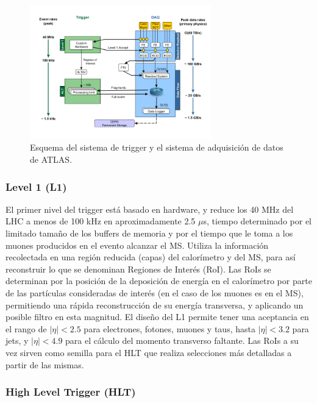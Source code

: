 \begin{figure}
  \centering
  \includegraphics[width=0.7\textwidth]{images/tdaq.png}
  \caption{Esquema del sistema de trigger y el sistema de adquisición de datos de ATLAS.}
  \label{tdaq}
\end{figure}

\subsubsection{Level 1 (L1)}

El primer nivel del trigger \cite{level1} está basado en hardware, y reduce los 40 MHz del LHC a menos de 100 kHz en aproximadamente 2.5 $\mu$s, tiempo determinado por el limitado tamaño de los buffers de memoria y por el tiempo que le toma a los muones producidos en el evento alcanzar el MS. Utiliza la información recolectada en una región reducida (capas) del calorímetro y del MS, para así reconstruir lo que se denominan Regiones de Interés (RoI). Las RoIs se determinan por la posición de la deposición de energía en el calorímetro por parte de las partículas consideradas de interés (en el caso de los muones es en el MS), permitiendo una rápida reconstrucción de su energía transversa, y aplicando un posible filtro en esta magnitud. El diseño del L1 permite tener una aceptancia en el rango de $|\eta|<2.5$ para electrones, fotones, muones y taus, hasta $|\eta|<3.2$ para jets, y $|\eta|<4.9$ para el cálculo del momento transverso faltante. Las RoIs a su vez sirven como semilla para el HLT que realiza selecciones más detalladas a partir de las mismas.

\subsubsection{High Level Trigger (HLT)}

